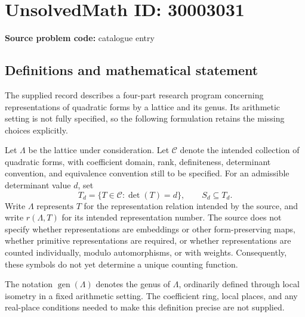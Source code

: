 \documentclass[11pt]{article}
\begin{document}
\section*{UnsolvedMath ID: 30003031}
\textbf{Source problem code:} catalogue entry
\subsection{Definitions and mathematical statement}
The supplied record describes a four-part research program concerning representations of quadratic forms by a lattice and its genus. Its arithmetic setting is not fully specified, so the following formulation retains the missing choices explicitly.

Let \(\Lambda\) be the lattice under consideration. Let \(\mathcal C\) denote the intended collection of quadratic forms, with coefficient domain, rank, definiteness, determinant convention, and equivalence convention still to be specified. For an admissible determinant value \(d\), set
\[
T_d=\{T\in\mathcal C:\det(T)=d\},\qquad S_d\subseteq T_d.
\]
Write \(\Lambda\text{ represents }T\) for the representation relation intended by the source, and write \(r(\Lambda,T)\) for its intended representation number. The source does not specify whether representations are embeddings or other form-preserving maps, whether primitive representations are required, or whether representations are counted individually, modulo automorphisms, or with weights. Consequently, these symbols do not yet determine a unique counting function.

The notation \(\operatorname{gen}(\Lambda)\) denotes the genus of \(\Lambda\), ordinarily defined through local isometry in a fixed arithmetic setting. The coefficient ring, local places, and any real-place conditions needed to make this definition precise are not supplied.
\end{document}
